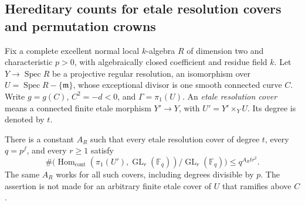 \subsection{Hereditary counts for etale resolution covers and permutation crowns}

Fix a complete excellent normal local $k$-algebra $R$ of dimension
 two and characteristic $p>0$, with algebraically closed coefficient
and residue field $k$. Let $Y\to\operatorname{Spec}R$ be a projective
regular resolution, an isomorphism over
$U=\operatorname{Spec}R-\{\mathfrak m\}$, whose exceptional divisor
is one smooth connected curve $C$. Write $g=g(C)$, $C^2=-d<0$,
and $\Gamma=\pi_1(U)$. An \emph{etale resolution cover} means a
connected finite etale morphism $Y'\to Y$, with
$U'=Y'\times_Y U$. Its degree is denoted by $t$.

\begin{theorem}
\label{D:etale-resolution-hereditary-linear-count}
There is a constant $A_R$ such that every etale resolution cover
of degree $t$, every $q=p^f$, and every $r\geq1$ satisfy
\[
 \#\bigl(\operatorname{Hom}_{\mathrm{cont}}
       (\pi_1(U'),\operatorname{GL}_r(\mathbb F_q))
                  /\operatorname{GL}_r(\mathbb F_q)\bigr)
                         \leq q^{A_R t r^2}.             \tag{D.HC.1}
\]
The same $A_R$ works for all such covers, including degrees
divisible by $p$. The assertion is not made for an arbitrary
finite etale cover of $U$ that ramifies above $C$.
\end{theorem}

